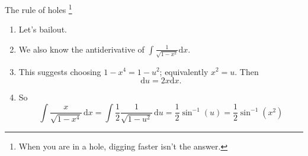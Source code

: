 \documentclass[fleqn]{beamer}
\theoremstyle{definition}
\newenvironment{checklist}{
  \begin{enumerate}[\ding{51}]
    \addtolength{\itemsep}{-0.0\itemsep}}
  {\end{enumerate}}
\begin{document}
\begin{frame}{The rule of holes \footnote{When you are in a hole, digging faster isn't the answer.}} 



\begin{checklist}

\item Let's bailout.


\item We also know the antiderivative of \(\int \frac{1}{\sqrt{1-x^2}} \mathrm{d} x \). 

\item This suggests choosing  \(1- x^4 = 1-u^2 \); equivalently \(x^2  = u\). Then
\[
     \mathrm{d} u = 2 x \mathrm{d} x.
\]

\item So
\[
       \int  \frac{x}{\sqrt{1-x^4}} \, \mathrm{d} x = \int \frac{1}{2} \frac{1}{\sqrt{1-u^2}} \, \mathrm{d} u = \frac{1}{2} \sin^{-1}(u) =  \frac{1}{2} \sin^{-1}(x^2) 
\]

\end{checklist}

\end{frame} 
\end{document}
